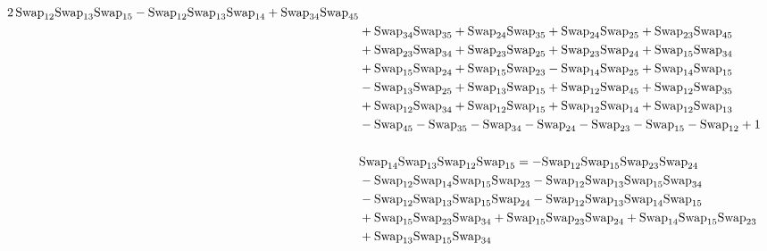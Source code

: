 \documentclass[12pt,dvipsnames,accepted=2016-08-18,a4paper,onecolumn]{quantumarticle}
\numberwithin{equation}{section}
\theoremstyle{definition}
\begin{document}
\begin{align*}
        2\,\textnormal{Swap}_{12} \textnormal{Swap}_{13} \textnormal{Swap}_{15} - \textnormal{Swap}_{12} \textnormal{Swap}_{13} \textnormal{Swap}_{14} + \textnormal{Swap}_{34} \textnormal{Swap}_{45}\\ & + \textnormal{Swap}_{34} \textnormal{Swap}_{35} + \textnormal{Swap}_{24} \textnormal{Swap}_{35} + \textnormal{Swap}_{24} \textnormal{Swap}_{25} +
        \textnormal{Swap}_{23} \textnormal{Swap}_{45}\\ & + \textnormal{Swap}_{23} \textnormal{Swap}_{34} + \textnormal{Swap}_{23} \textnormal{Swap}_{25} + \textnormal{Swap}_{23} \textnormal{Swap}_{24} + \textnormal{Swap}_{15} \textnormal{Swap}_{34}\\ & + \textnormal{Swap}_{15} \textnormal{Swap}_{24} + \textnormal{Swap}_{15} \textnormal{Swap}_{23} -
        \textnormal{Swap}_{14} \textnormal{Swap}_{25} + \textnormal{Swap}_{14} \textnormal{Swap}_{15}\\ & - \textnormal{Swap}_{13} \textnormal{Swap}_{25} + \textnormal{Swap}_{13} \textnormal{Swap}_{15} + \textnormal{Swap}_{12} \textnormal{Swap}_{45} + \textnormal{Swap}_{12} \textnormal{Swap}_{35}\\ & + \textnormal{Swap}_{12} \textnormal{Swap}_{34} +
        \textnormal{Swap}_{12} \textnormal{Swap}_{15} + \textnormal{Swap}_{12} \textnormal{Swap}_{14} + \textnormal{Swap}_{12} \textnormal{Swap}_{13}\\ & - \textnormal{Swap}_{45} - \textnormal{Swap}_{35} - \textnormal{Swap}_{34} - \textnormal{Swap}_{24} - \textnormal{Swap}_{23} - \textnormal{Swap}_{15} - \textnormal{Swap}_{12} +
        1\\
        \\
        &\textnormal{Swap}_{14}   \textnormal{Swap}_{13}   \textnormal{Swap}_{12}   \textnormal{Swap}_{15} =  -\textnormal{Swap}_{12} \textnormal{Swap}_{15} \textnormal{Swap}_{23} \textnormal{Swap}_{24}\\ & - \textnormal{Swap}_{12} \textnormal{Swap}_{14} \textnormal{Swap}_{15} \textnormal{Swap}_{23} - \textnormal{Swap}_{12} \textnormal{Swap}_{13} \textnormal{Swap}_{15} \textnormal{Swap}_{34}\\ & - \textnormal{Swap}_{12} \textnormal{Swap}_{13} \textnormal{Swap}_{15} \textnormal{Swap}_{24} -
        \textnormal{Swap}_{12} \textnormal{Swap}_{13} \textnormal{Swap}_{14} \textnormal{Swap}_{15}\\ & + \textnormal{Swap}_{15} \textnormal{Swap}_{23} \textnormal{Swap}_{34} + \textnormal{Swap}_{15} \textnormal{Swap}_{23} \textnormal{Swap}_{24} + \textnormal{Swap}_{14} \textnormal{Swap}_{15} \textnormal{Swap}_{23}\\ & + \textnormal{Swap}_{13} \textnormal{Swap}_{15} \textnormal{Swap}_{34}

\end{align*}
\end{document}
